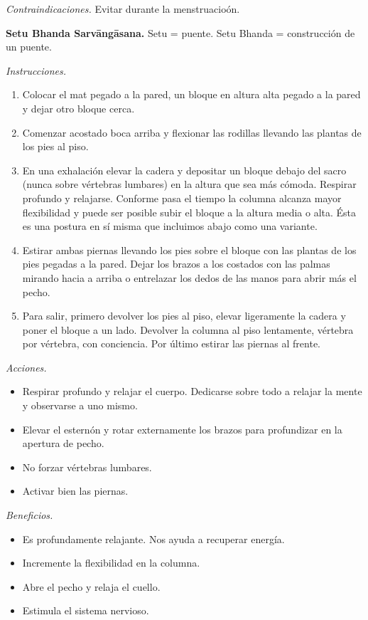 \emph{Contraindicaciones.} Evitar durante la
menstruacioón.

\medskip\noindent\textbf{Setu Bhanda
Sarvāngāsana.}
Setu = puente. Setu Bhanda = construcción de
un puente.

\emph{Instrucciones.}
\begin{enumerate}
\item Colocar el mat pegado a la pared, un
bloque en altura alta pegado a la pared y
dejar otro bloque cerca.
\item Comenzar acostado boca arriba y
flexionar las rodillas llevando las plantas
de los pies al piso.
\item En una exhalación elevar la cadera y
depositar un bloque debajo del sacro (nunca
sobre vértebras lumbares) en la altura que
sea más cómoda. Respirar profundo y
relajarse. Conforme pasa el tiempo la columna
alcanza mayor flexibilidad y puede ser
posible subir el bloque a la altura media o
alta. Ésta es una postura en sí misma que
incluimos abajo como una variante.
\item Estirar ambas piernas llevando los pies
sobre el bloque con las plantas de los pies
pegadas a la pared. Dejar los brazos a los
costados con las palmas mirando hacia a
arriba o entrelazar los dedos de las manos
para abrir más el pecho.
\item Para salir, primero devolver los pies
al piso, elevar ligeramente la cadera y poner
el bloque a un lado. Devolver la columna al
piso lentamente, vértebra por vértebra, con
conciencia. Por último estirar las piernas al
frente.
\end{enumerate}

\emph{Acciones.}
\begin{itemize}
\item Respirar profundo y relajar el cuerpo.
Dedicarse sobre todo a relajar la mente y
observarse a uno mismo.
\item Elevar el esternón y rotar externamente
los brazos para profundizar en la apertura de
pecho.
\item No forzar vértebras lumbares.
\item Activar bien las piernas.
\end{itemize}

\emph{Beneficios.}
\begin{itemize}
\item Es profundamente relajante. Nos ayuda a
recuperar energía.
\item Incremente la flexibilidad en la
columna.
\item Abre el pecho y relaja el cuello.
\item Estimula el sistema nervioso.
\end{itemize}

